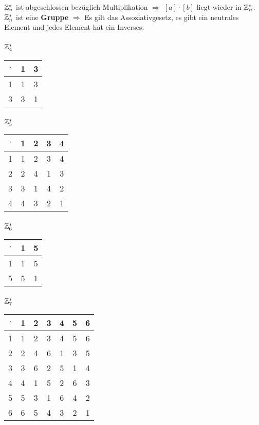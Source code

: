 $\mathbb{Z}_n^*$ ist abgeschlossen bezüglich Multiplikation $\Rightarrow$ $[a]\cdot [b]$ liegt wieder in $\mathbb{Z}_n^*$. $\mathbb{Z}_n^*$ ist eine \textbf{Gruppe} $\Rightarrow$ Es gilt das Assoziativgesetz, es gibt ein neutrales Element und jedes Element hat ein Inverses. 

\subsubsection{$\mathbb{Z}_{4}^*$}
\begin{tabular}{|c|c|c|}
\hline $\cdot$  & 1 & 3\\
\hline 1 & 1 & 3\\
\hline 3 & 3 & 1\\
\hline
\end{tabular}


\subsubsection{$\mathbb{Z}_{5}^*$}
\begin{tabular}{|c|c|c|c|c|}
\hline $\cdot$  & 1 & 2 & 3 & 4\\
\hline 1 & 1 & 2 & 3 & 4\\
\hline 2 & 2 & 4 & 1 & 3\\
\hline 3 & 3 & 1 & 4 & 2\\
\hline 4 & 4 & 3 & 2 & 1\\
\hline
\end{tabular}


\subsubsection{$\mathbb{Z}_{6}^*$}
\begin{tabular}{|c|c|c|}
\hline $\cdot$  & 1 & 5\\
\hline 1 & 1 & 5\\
\hline 5 & 5 & 1\\
\hline
\end{tabular}


\subsubsection{$\mathbb{Z}_{7}^*$}
\begin{tabular}{|c|c|c|c|c|c|c|}
\hline $\cdot$  & 1 & 2 & 3 & 4 & 5 & 6\\
\hline 1 & 1 & 2 & 3 & 4 & 5 & 6\\
\hline 2 & 2 & 4 & 6 & 1 & 3 & 5\\
\hline 3 & 3 & 6 & 2 & 5 & 1 & 4\\
\hline 4 & 4 & 1 & 5 & 2 & 6 & 3\\
\hline 5 & 5 & 3 & 1 & 6 & 4 & 2\\
\hline 6 & 6 & 5 & 4 & 3 & 2 & 1\\
\hline
\end{tabular}


